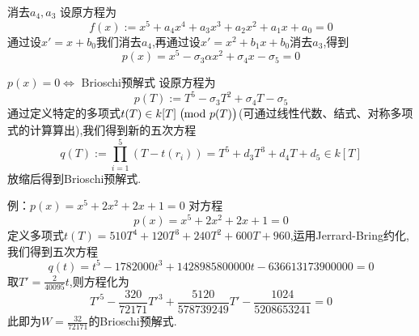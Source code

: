 \documentclass[pdf]{beamer}
\numberwithin{equation}{section}
\theoremstyle{plain}
\theoremstyle{plain}
\theoremstyle{remark}
\begin{document}
\begin{frame}{消去$a_4,a_3$}
设原方程为
$$f(x):=x^5+a_4x^4+a_3x^3+a_2x^2+a_1x+a_0=0$$
通过设$x'=x+b_0$我们消去$a_4$,再通过设$x'=x^2+b_1x+b_0$消去$a_3$,得到
$$p(x)=x^5-\sigma_3\alpha x^2+\sigma_4 x-\sigma_5=0$$
\end{frame}
\begin{frame}{$p(x)=0 \Longleftrightarrow $ Brioschi预解式}
设原方程为
$$p(T):=T^5-\sigma_3 T^2+\sigma_4 T -\sigma_5$$
通过定义特定的多项式$t(T) \in k[T] \; \big(\hspace{-0.25cm}\mod p(T)\big)$(可通过线性代数、结式、对称多项式的计算算出),我们得到新的五次方程
\begin{equation*}
q(T):=\prod_{i=1}^{5} (T-t(r_i))=T^5+d_3T^3+d_4T+d_5 \in k[T]
\end{equation*}
放缩后得到Brioschi预解式.
\end{frame}
\begin{frame}{例：$p(x)=x^5+2x^2+2x+1=0$}
对方程
$$p(x)=x^5+2x^2+2x+1=0$$
定义多项式$t(T)=510T^4+120T^3+240T^2+600T+960$,运用Jerrard-Bring约化,我们得到五次方程
\begin{equation*}
q(t)=t^5-1782000t^3+1428985800000t-636613173900000 =0
\end{equation*}
取$T'=\frac{2}{40095}t$,则方程化为
\begin{equation*}
T'^5-\frac{320}{72171}T'^3+\frac{5120}{578739249}T'-\frac{1024}{5208653241}=0
\end{equation*}
此即为$W=\frac{32}{72171}$的Brioschi预解式.
\hyperlink{flowchart1}{}
\end{frame}

\end{document}
